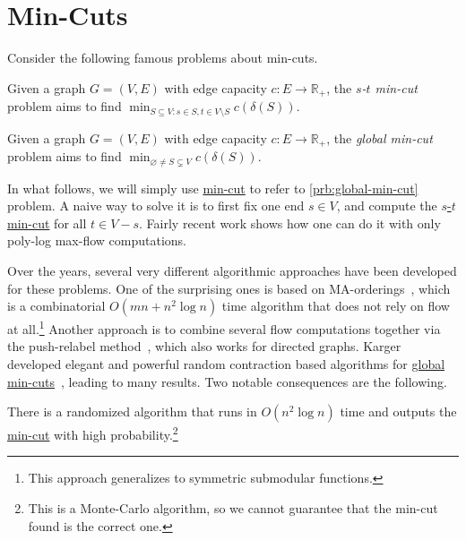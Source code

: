 \section{Min-Cuts}
Consider the following famous problems about min-cuts.

\begin{problem}\label{prb:s-t-min-cut}
Given a graph \(G = (V, E)\) with edge capacity \(c \colon E \to \mathbb{R} _+ \), the \emph{\(s\)-\(t\) min-cut} problem aims to find \(\min _{S \subseteq V \colon s \in S, t \in V\setminus S} c(\delta (S))\).
\end{problem}

\begin{problem}\label{prb:global-min-cut}
Given a graph \(G = (V, E)\) with edge capacity \(c \colon E \to \mathbb{R} _+ \), the \emph{global min-cut} problem aims to find \(\min _{\varnothing \neq S \subsetneq V} c(\delta (S))\).
\end{problem}

In what follows, we will simply use \hyperref[prb:global-min-cut]{min-cut} to refer to \autoref{prb:global-min-cut} problem. A naive way to solve it is to first fix one end \(s \in V\), and compute the \hyperref[prb:s-t-min-cut]{\(s\)-\(t\) min-cut} for all \(t \in V - s\). Fairly recent work shows how one can do it with only poly-log max-flow computations.

Over the years, several very different algorithmic approaches have been developed for these problems. One of the surprising ones is based on MA-orderings~\cite{nagamochi1992computing}, which is a combinatorial \(O(mn + n^2 \log n)\) time algorithm that does not rely on flow at all.\footnote{This approach generalizes to symmetric submodular functions.} Another approach is to combine several flow computations together via the push-relabel method~\cite{hao1994faster}, which also works for directed graphs. Karger developed elegant and powerful random contraction based algorithms for \hyperref[prb:global-min-cut]{global min-cuts}~\cite{karger1995random}, leading to many results. Two notable consequences are the following.

\begin{theorem}\label{thm:Karger-min-cut}
	There is a randomized algorithm that runs in \(O(n^2 \log n)\) time and outputs the \hyperref[prb:global-min-cut]{min-cut} with high probability.\footnote{This is a Monte-Carlo algorithm, so we cannot guarantee that the min-cut found is the correct one.}
\end{theorem}

